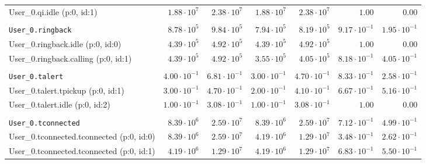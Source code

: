 \begin{table}[htbp]
{\begin{tabular}{lrrrrrr}
\hspace{3mm}User\_0.qi.idle (p:0, id:1)               &  $1.88 \cdot 10^{7}$ &  $2.38 \cdot 10^{7}$ &  $1.88 \cdot 10^{7}$ &  $2.38 \cdot 10^{7}$ &               $1.00$ &               $0.00$ \\
\\[-8pt]\texttt{User\_0.ringback}                     &  $8.78 \cdot 10^{5}$ &  $9.84 \cdot 10^{5}$ &  $7.94 \cdot 10^{5}$ &  $8.19 \cdot 10^{5}$ & $9.17 \cdot 10^{-1}$ & $1.95 \cdot 10^{-1}$ \\
\hspace{3mm}User\_0.ringback.idle (p:0, id:0)         &  $4.39 \cdot 10^{5}$ &  $4.92 \cdot 10^{5}$ &  $4.39 \cdot 10^{5}$ &  $4.92 \cdot 10^{5}$ &               $1.00$ &               $0.00$ \\
\hspace{3mm}User\_0.ringback.calling (p:0, id:1)      &  $4.39 \cdot 10^{5}$ &  $4.92 \cdot 10^{5}$ &  $3.55 \cdot 10^{5}$ &  $4.05 \cdot 10^{5}$ & $8.18 \cdot 10^{-1}$ & $4.05 \cdot 10^{-1}$ \\
\\[-8pt]\texttt{User\_0.talert}                       & $4.00 \cdot 10^{-1}$ & $6.81 \cdot 10^{-1}$ & $3.00 \cdot 10^{-1}$ & $4.70 \cdot 10^{-1}$ & $8.33 \cdot 10^{-1}$ & $2.58 \cdot 10^{-1}$ \\
\hspace{3mm}User\_0.talert.tpickup (p:0, id:1)        & $3.00 \cdot 10^{-1}$ & $4.70 \cdot 10^{-1}$ & $2.00 \cdot 10^{-1}$ & $4.10 \cdot 10^{-1}$ & $6.67 \cdot 10^{-1}$ & $5.16 \cdot 10^{-1}$ \\
\hspace{3mm}User\_0.talert.idle (p:0, id:2)           & $1.00 \cdot 10^{-1}$ & $3.08 \cdot 10^{-1}$ & $1.00 \cdot 10^{-1}$ & $3.08 \cdot 10^{-1}$ &               $1.00$ &               $0.00$ \\
\\[-8pt]\texttt{User\_0.tconnected}                   &  $8.39 \cdot 10^{6}$ &  $2.59 \cdot 10^{7}$ &  $8.39 \cdot 10^{6}$ &  $2.59 \cdot 10^{7}$ & $7.12 \cdot 10^{-1}$ & $4.99 \cdot 10^{-1}$ \\
\hspace{3mm}User\_0.tconnected.tconnected (p:0, id:0) &  $8.39 \cdot 10^{6}$ &  $2.59 \cdot 10^{7}$ &  $4.19 \cdot 10^{6}$ &  $1.29 \cdot 10^{7}$ & $3.48 \cdot 10^{-1}$ & $2.62 \cdot 10^{-1}$ \\
\hspace{3mm}User\_0.tconnected.tconnected (p:0, id:1) &  $4.19 \cdot 10^{6}$ &  $1.29 \cdot 10^{7}$ &  $4.19 \cdot 10^{6}$ &  $1.29 \cdot 10^{7}$ & $6.83 \cdot 10^{-1}$ & $5.50 \cdot 10^{-1}$ \\

\end{tabular}}
\end{table}
